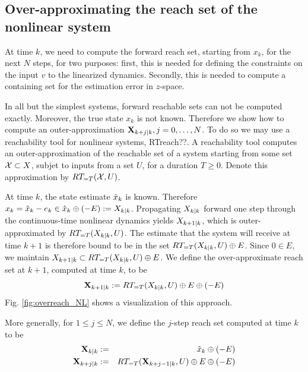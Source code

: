  \subsection{Over-approximating the reach set of the nonlinear system}
\label{sec:x reach}

At time $k$, we need to compute the forward reach set, starting from $x_k$, for the next $N$ steps, for two purposes:
first, this is needed for defining the constraints on the input $v$ to the linearized dynamics.
Secondly, this is needed to compute a containing set for the estimation error in $z$-space.

In all but the simplest systems, forward reachable sets can not be computed exactly.
Moreover, the true state $x_k$ is not known.
Therefore we show how to compute an outer-approximation $\mathbf{X}_{k+j|k},  j=0,\ldots, N$.
To do so we may use a reachability tool for nonlinear systems, RTreach??. 
A reachability tool computes an outer-approximation of the reachable set of a system starting from some set $\mathcal{X} \subset X$, subjet to inputs from a set $U$, for a duration $T \geq 0$. 
Denote this approximation by $RT_{=T}(\mathcal{X},U)$.

At time $k$, the state estimate $\hat{x}_{k}$ is known.
Therefore $x_k = \hat{x}_{k} - e_k \in \hat{x}_{k} \oplus (-E) := X_{k|k}$.
Propagating $X_{k|k}$ forward one step through the continuous-time nonlinear dynamics yields $X_{k+1|k}$, which is outer-approximated by $RT_{=T}(X_{k|k},U)$.
The estimate that the system will receive at time $k+1$ is therefore bound to be in the set $RT_{=T}(X_{k|k},U)  \oplus E$.
Since $0 \in E$, we maintain $X_{k+1|k} \subset RT_{=T}(X_{k|k},U)  \oplus E$.
We define the over-approximate reach set at $k+1$, computed at time $k$, to be 
\begin{equation*}
\label{eq:def Xk}
\mathbf{X}_{k+1|k} :=  RT_{=T}(X_{k|k},U)  \oplus E \oplus  (-E)
\end{equation*}
Fig. \ref{fig:overreach_NL} shows a visualization of this approach.

More generally, for $1 \leq j \leq N$, we define the $j$-step reach set computed at time $k$ to be
\begin{eqnarray}
\label{eq:def Xkj}
\mathbf{X}_{k|k} &:=&   \hat{x}_{k} \oplus (-E) 
\nonumber
\\
\mathbf{X}_{k+j|k} & :=& RT_{=T}(\mathbf{X}_{k+j-1|k},U) \oplus E \oplus (-E) 
\end{eqnarray}

